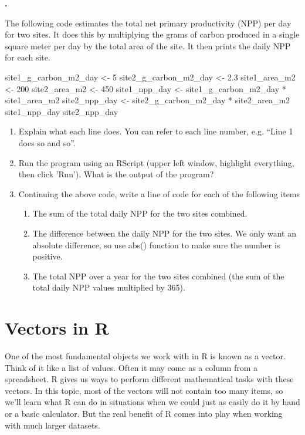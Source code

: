 \documentclass[11pt]{amsart}
\renewcommand{\(}{\left(}
\renewcommand{\)}{\right)}
\newcounter{CounterQ}
\newenvironment{q}{%
	\refstepcounter{CounterQ}
	\noindent\textbf{\Large{\theCounterQ}.}
}{
	\vspace{2ex}
}
\begin{document}

\begin{q}
  The following code estimates the total net primary productivity
  (NPP) per day for two sites. It does this by multiplying the grams
  of carbon produced in a single square meter per day by the total
  area of the site. It then prints the daily NPP for each site.

\begin{rcode}
site1_g_carbon_m2_day <- 5 
site2_g_carbon_m2_day <- 2.3 
site1_area_m2 <- 200 
site2_area_m2 <- 450 
site1_npp_day <- site1_g_carbon_m2_day * site1_area_m2 
site2_npp_day <- site2_g_carbon_m2_day * site2_area_m2 
site1_npp_day 
site2_npp_day 
\end{rcode}

\begin{enumerate}
\item Explain what each line does. You can refer to each line number, e.g. ``Line 1 does so and so''. 
\item Run the program using an RScript (upper left window, highlight
  everything, then click 'Run'). What is the output of the program?
\item Continuing the above code, write a line of code for each of the
  following items
  \begin{enumerate}
  \item The sum of the total daily NPP for the two sites combined.  
  \item The difference between the daily NPP for the two sites. We
    only want an absolute difference, so use abs() function to make
    sure the number is positive.  
  \item The total NPP over a year for the two sites combined (the sum
    of the total daily NPP values multiplied by 365).
  \end{enumerate}  
\end{enumerate}

\end{q} 

\section{Vectors in R}

One of the most fundamental objects we work with in R is known as a vector.  Think of it like a list of values. Often it may come as a column from a spreadsheet.  R gives us ways to perform different mathematical tasks with these vectors.  In this topic, most of the vectors will not contain too many items, so we'll learn what R can do in situations when we could just as easily do it by hand or a basic calculator.  But the real benefit of R comes into play when working with much larger datasets.
\end{document}
